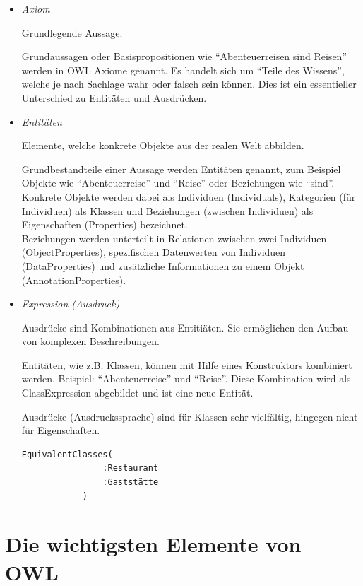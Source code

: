\begin{itemize}
    \item \textit{Axiom}

        Grundlegende Aussage.

        Grundaussagen  oder Basispropositionen wie ``Abenteuerreisen sind Reisen'' werden in OWL Axiome genannt. Es handelt sich  um ``Teile des Wissens'', welche je nach Sachlage wahr oder falsch sein können. Dies ist ein essentieller Unterschied zu Entitäten und Ausdrücken.

    \item \textit{Entitäten}

        Elemente, welche konkrete Objekte aus der realen Welt abbilden.

        Grundbestandteile einer Aussage werden Entitäten genannt, zum Beispiel Objekte wie ``Abenteuerreise'' und ``Reise'' oder Beziehungen wie ``sind''.\\
        Konkrete Objekte werden dabei als Individuen (Individuals), Kategorien (für Individuen) als Klassen und Beziehungen (zwischen Individuen) als Eigenschaften (Properties) bezeichnet.\\
        Beziehungen werden unterteilt in Relationen zwischen zwei Individuen (ObjectProperties), spezifischen Datenwerten von Individuen (DataProperties) und zusätzliche Informationen zu einem Objekt (AnnotationProperties).

	\item \textit{Expression (Ausdruck)}

        Ausdrücke sind Kombinationen aus Entitiäten. Sie ermöglichen den Aufbau von komplexen Beschreibungen.

        Entitäten, wie z.B. Klassen, können mit Hilfe eines Konstruktors kombiniert werden. Beispiel: ``Abenteuerreise'' und ``Reise''. Diese Kombination wird als ClassExpression abgebildet und ist eine neue Entität.

        Ausdrücke (Ausdruckssprache) sind für Klassen sehr vielfältig, hingegen nicht für Eigenschaften.

        \begin{lstlisting}[caption={Beispiel eines Ausdrucks: Zwei Klassen bedeuten das Gleiche}]
            EquivalentClasses(
                :Restaurant
                :Gaststätte
            )
        \end{lstlisting}

\end{itemize}


\section{Die wichtigsten Elemente von OWL}
\label{sec:owlRdf_owl_wichtigsteElemente}

